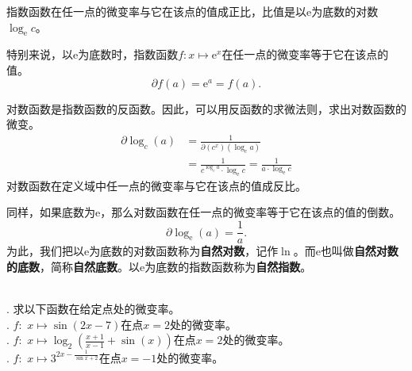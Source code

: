 \documentclass[12pt,UTF8,fontset=none]{ctexbook}
\begin{document}
指数函数在任一点的微变率与它在该点的值成正比，比值是以$\mathrm{e}$为底数的对数$\log_{\mathrm{e}}{c}$。

特别来说，以$\mathrm{e}$为底数时，指数函数$f: x\mapsto \mathrm{e}^x$在任一点的微变率等于它在该点的值。
$$ \partial f (a) = \mathrm{e}^a = f(a).$$

对数函数是指数函数的反函数。因此，可以用反函数的求微法则，求出对数函数的微变。
\begin{align*}
    \partial \log_c (a) &= \frac{1}{\partial (c^x) (\log_c{a})}  \\
    &= \frac{1}{c^{\log_c{a}} \cdot \log_{\mathrm{e}}{c}} = \frac{1}{a \cdot \log_{\mathrm{e}}{c}}   
\end{align*}
对数函数在定义域中任一点的微变率与它在该点的值成反比。

同样，如果底数为$\mathrm{e}$，那么对数函数在任一点的微变率等于它在该点的值的倒数。
$$ \partial \log_{\mathrm{e}} (a) = \frac{1}{a}.$$
为此，我们把以$\mathrm{e}$为底数的对数函数称为\textbf{自然对数}，记作$\ln$。而$\mathrm{e}$也叫做\textbf{自然对数的底数}，简称\textbf{自然底数}。以$\mathrm{e}$为底数的指数函数称为\textbf{自然指数}。

\begin{et}
    \mbox{} \\
    . 求以下函数在给定点处的微变率。\\
    . $f: \,\, x \mapsto \sin{(2x - 7)}$在点$x = 2$处的微变率。\\
    . $f: \,\, x \mapsto \log_2{\left(\frac{x+1}{x-1} + \sin(x)\right)}$在点$x = 2$处的微变率。\\
    . $f: \,\, x \mapsto 3^{2x - \frac{1}{\sin{x} + 2}}$在点$x = -1$处的微变率。\\
\end{et}
\end{document}
